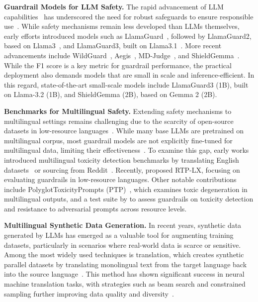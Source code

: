 \noindent\textbf{Guardrail Models for LLM Safety.}
The rapid advancement of LLM capabilities~\citep{touvron2023llama,touvron2023llama2,openai2023gpt4} has underscored the need for robust safeguards to ensure responsible use~\citep{yao2024survey,dong2024building}. While safety mechanisms remain less developed than LLMs themselves, early efforts introduced models such as LlamaGuard~\citep{inan2023llama}, followed by LlamaGuard2, based on Llama3~\citep{dubey2024llama}, and LlamaGuard3, built on Llama3.1~\citep{dubey2024llama}. More recent advancements include WildGuard~\citep{han2024wildguard}, Aegis~\citep{ghosh2024aegis}, MD-Judge~\citep{li2024salad}, and ShieldGemma~\citep{zeng2024shieldgemma}.  
While the F1 score is a key metric for guardrail performance, the practical deployment also demands models that are small in scale and inference-efficient. In this regard, state-of-the-art small-scale models include LlamaGuard3 (1B), built on Llama-3.2 (1B), and ShieldGemma (2B), based on Gemma 2 (2B).  

\noindent\textbf{Benchmarks for Multilingual Safety.}
Extending safety mechanisms to multilingual settings remains challenging due to the scarcity of open-source datasets in low-resource languages~\citep{deng2024multilingual}. While many base LLMs are pretrained on multilingual corpus, most guardrail models are not explicitly fine-tuned for multilingual data, limiting their effectiveness~\citep{de2024rtp}.  
To examine this gap, early works introduced multilingual toxicity detection benchmarks by translating English datasets~\citep{wang2023all} or sourcing from Reddit~\citep{ye2023multilingual}. Recently, \citet{de2024rtp} proposed RTP-LX, focusing on evaluating guardrails in low-resource languages. Other notable contributions include PolyglotToxicityPrompts (PTP)~\citep{jain2024polyglotoxicityprompts}, which examines toxic degeneration in multilingual outputs, and a test suite by \citet{yang2024benchmarking} to assess guardrails on toxicity detection and resistance to adversarial prompts across resource levels.

\noindent\textbf{Multilingual Synthetic Data Generation.} In recent years, synthetic data generated by LLMs has emerged as a valuable tool for augmenting training datasets, particularly in scenarios where real-world data is scarce or sensitive. Among the most widely used techniques is translation, which creates synthetic parallel datasets by translating monolingual text from the target language back into the source language~\citep{bi-etal-2021-data, caswell-etal-2019-tagged, liao-etal-2021-back, marie-etal-2020-tagged, pham2021metaback, sennrich-etal-2016-improving, xu-etal-2022-synthetic}. This method has shown significant success in neural machine translation tasks, with strategies such as beam search and constrained sampling further improving data quality and diversity~\citep{sennrich-etal-2016-improving, edunov-etal-2018-understanding, xu-etal-2022-synthetic}.



